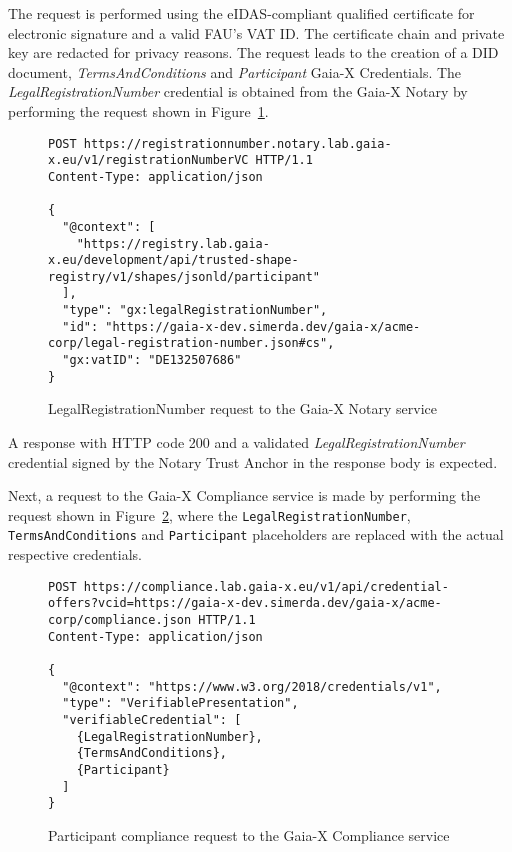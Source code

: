 The request is performed using the eIDAS-compliant qualified certificate for electronic signature and a valid FAU's VAT ID.
The certificate chain and private key are redacted for privacy reasons.
The request leads to the creation of a DID document, \textit{TermsAndConditions} and \textit{Participant} Gaia-X Credentials.
The \textit{LegalRegistrationNumber} credential is obtained from the Gaia-X Notary by performing the request shown in Figure~\ref{fig:test_case_1_notary}.

\begin{figure}[h]
    \centering
    \begin{verbatim}
POST https://registrationnumber.notary.lab.gaia-x.eu/v1/registrationNumberVC HTTP/1.1
Content-Type: application/json

{
  "@context": [
    "https://registry.lab.gaia-x.eu/development/api/trusted-shape-registry/v1/shapes/jsonld/participant"
  ],
  "type": "gx:legalRegistrationNumber",
  "id": "https://gaia-x-dev.simerda.dev/gaia-x/acme-corp/legal-registration-number.json#cs",
  "gx:vatID": "DE132507686"
}
    \end{verbatim}
    \caption{LegalRegistrationNumber request to the Gaia-X Notary service}\label{fig:test_case_1_notary}
\end{figure}

A response with HTTP code 200 and a validated \textit{LegalRegistrationNumber} credential signed by the Notary Trust Anchor in the response body is expected.

Next, a request to the Gaia-X Compliance service is made by performing the request shown in Figure~\ref{fig:test_case_1_compliance}, where the \texttt{LegalRegistrationNumber}, \texttt{TermsAndConditions} and \texttt{Participant} placeholders are replaced with the actual respective credentials.

\begin{figure}[h]
    \centering
    \begin{verbatim}
POST https://compliance.lab.gaia-x.eu/v1/api/credential-offers?vcid=https://gaia-x-dev.simerda.dev/gaia-x/acme-corp/compliance.json HTTP/1.1
Content-Type: application/json

{
  "@context": "https://www.w3.org/2018/credentials/v1",
  "type": "VerifiablePresentation",
  "verifiableCredential": [
    {LegalRegistrationNumber},
    {TermsAndConditions},
    {Participant}
  ]
}
    \end{verbatim}
    \caption{Participant compliance request to the Gaia-X Compliance service}\label{fig:test_case_1_compliance}
\end{figure}

